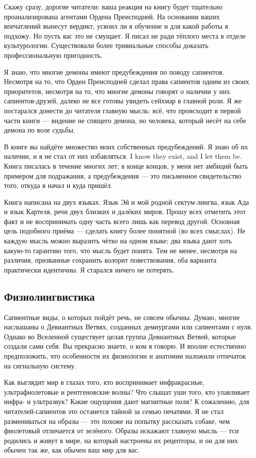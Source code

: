 Скажу сразу, дорогие читатели: ваша реакция на книгу будет тщательно проанализирована агентами Ордена Преисподней.
На основании ваших впечатлений вынесут вердикт, усвоил ли я обучение и для какой работы я подхожу.
Но пусть вас это не смущает.
Я писал не ради тёплого места в отделе культурологии.
Существовали более тривиальные способы доказать профессиональную пригодность.

Я знаю, что многие демоны имеют предубеждения по поводу сапиентов.
Несмотря на то, что Орден Преисподней сделал права сапиентов одним из своих приоритетов, несмотря на то, что многие демоны говорят о наличии у них сапиентов-друзей, далеко не все готовы увидеть сейхмар в главной роли.
Я же постарался донести до читателя главную мысль: всё, что происходит в первой части книги --- видение не спящего демона, но человека, который несёт на себе демона по воле судьбы.

В книге вы найдёте множество моих собственных предубеждений.
{Я знаю об их наличии, и я не стал от них избавляться.}
{I know they exist, and I let them be.}
Книга писалась в течение многих лет;
в конце концов, у меня нет амбиций быть примером для подражания, а предубеждения --- это письменное свидетельство того, откуда я начал и куда пришёл.

Книга написана на двух языках.
Язык Эй и мой родной сектум-лингва, язык Ада и язык Картеля, речи двух близких и далёких миров.
Прошу всех отметить этот факт и не воспринимать одну часть всего лишь как перевод другой.
Основная цель подобного приёма --- сделать книгу более понятной (во всех смыслах).
Не каждую мысль можно выразить чётко на одном языке;
два языка дают хоть какую-то гарантию того, что мысль будет понята.
Тем не менее, несмотря на различия, призванные сохранить колорит повествования, оба варианта практически идентичны.
Я старался ничего не потерять.

\subsection*{Физиолингвистика}

Сапиентные виды, о которых пойдёт речь, не совсем обычны.
Думаю, многие наслышаны о Девиантных Ветвях, созданных демиургами или сапиентами с нуля.
Однако во Вселенной существует целая группа Девиантных Ветвей, которые создали сами себя.
Вы прекрасно знаете, о ком я говорю.
И вполне естественно предположить, что особенности их физиологии и анатомии наложили отпечаток на сигнальную систему.

Как выглядит мир в глазах того, кто воспринимает инфракрасные, ультрафиолетовые и рентгеновские волны?
Что слышат уши того, кто улавливает инфра- и ультразвук?
Какие ощущения дают магнитные поля?
К сожалению, для читателей-сапиентов это останется тайной за семью печатями.
Я не стал размениваться на образы --- это похоже на попытку рассказать собаке, чем фиолетовый отличается от зелёного.
Образы искажают главную мысль --- тси родились и живут в мире, на который настроены их рецепторы, и он для них обычен так же, как обычен ваш мир для вас.

